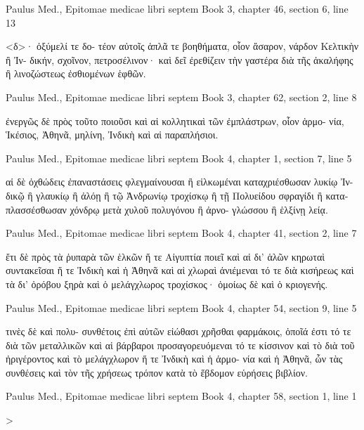 \documentclass[12pt,letterpaper,twoside,final]{memoir}
\begin{document}
\begin{greek}
Paulus Med., Epitomae medicae libri septem 
Book 3, chapter 46, section 6, line 13

                                                                       <δ>· ὀξύμελί τε δο-
τέον αὐτοῖς ἁπλᾶ τε βοηθήματα, οἷον ἄσαρον, νάρδον Κελτικὴν ἢ Ἰν-
δικήν, σχοῖνον, πετροσέλινον· καὶ δεῖ ἐρεθίζειν τὴν γαστέρα διὰ τῆς 
ἀκαλήφης ἢ λινοζώστεως ἐσθιομένων ἑφθῶν. 



Paulus Med., Epitomae medicae libri septem 
Book 3, chapter 62, section 2, line 8

                                                                                 ἐνεργῶς 
δὲ πρὸς τοῦτο ποιοῦσι καὶ αἱ κολλητικαὶ τῶν ἐμπλάστρων, οἷον ἁρμο-
νία, Ἱκέσιος, Ἀθηνᾶ, μηλίνη, Ἰνδικὴ καὶ αἱ παραπλήσιοι. 



Paulus Med., Epitomae medicae libri septem 
Book 4, chapter 1, section 7, line 5

                                                                    αἱ δὲ ὀχθώδεις 
ἐπαναστάσεις φλεγμαίνουσαι ἢ εἱλκωμέναι καταχριέσθωσαν λυκίῳ Ἰν-
δικῷ ἢ γλαυκίῳ ἢ ἀλόῃ ἢ τῷ Ἀνδρωνίῳ τροχίσκῳ ἢ τῇ Πολυείδου 
σφραγίδι ἢ καταπλασσέσθωσαν χόνδρῳ μετὰ χυλοῦ πολυγόνου ἢ ἀρνο-
γλώσσου ἢ ἑλξίνῃ λείᾳ. 



Paulus Med., Epitomae medicae libri septem 
Book 4, chapter 41, section 2, line 7

ἔτι δὲ πρὸς τὰ ῥυπαρὰ τῶν ἑλκῶν ἥ τε Αἰγυπτία ποιεῖ καὶ αἱ 
δι' ἁλῶν κηρωταὶ συντακεῖσαι ἥ τε Ἰνδικὴ καὶ ἡ Ἀθηνᾶ καὶ αἱ χλωραὶ 
ἀνιέμεναι τό τε διὰ κισήρεως καὶ τὰ δι' ὀρόβου ξηρὰ καὶ ὁ μελάγχλωρος 
τροχίσκος· ὁμοίως δὲ καὶ ὁ κριογενής. 



Paulus Med., Epitomae medicae libri septem 
Book 4, chapter 54, section 9, line 5

                                                            τινὲς δὲ καὶ πολυ-
συνθέτοις ἐπὶ αὐτῶν εἰώθασι χρῆσθαι φαρμάκοις, ὁποῖά ἐστι τό τε διὰ 
τῶν μεταλλικῶν καὶ αἱ βάρβαροι προσαγορευόμεναι τό τε κίσσινον καὶ 
τὸ διὰ τοῦ ἠριγέροντος καὶ τὸ μελάγχλωρον ἥ τε Ἰνδικὴ καὶ ἡ ἁρμο-
νία καὶ ἡ Ἀθηνᾶ, ὧν τὰς συνθέσεις καὶ τὸν τῆς χρήσεως τρόπον κατὰ 
τὸ ἕβδομον εὑρήσεις βιβλίον. 



Paulus Med., Epitomae medicae libri septem 
Book 4, chapter 58, section 1, line 1

                             >



\end{greek}
\end{document}
